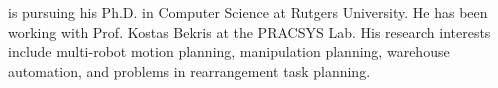 

\vspace{0.3in}
 is pursuing his Ph.D. in Computer
Science at Rutgers University. He has been working with Prof. Kostas Bekris at
the PRACSYS Lab. His research interests include multi-robot motion
planning, manipulation planning, warehouse automation, and problems in rearrangement task planning.  

\vspace{0.2in}

